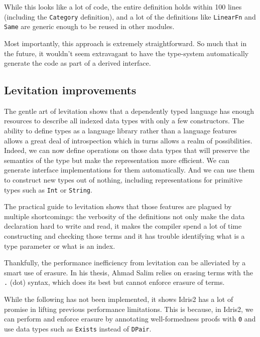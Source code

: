 \documentclass[
]{article}
\begin{document}
While this looks like a lot of code, the entire definition holds within
100 lines (including the \texttt{Category} definition), and a lot of the
definitions like \texttt{LinearFn} and \texttt{Same} are generic enough
to be reused in other modules.

Most importantly, this approach is extremely straightforward. So much
that in the future, it wouldn't seem extravagant to have the type-system
automatically generate the code as part of a derived interface.

\hypertarget{levitation-improvements}{%
\subsection{Levitation improvements}\label{levitation-improvements}}

The gentle art of levitation\cite{levitation} shows that a dependently
typed language has enough resources to describe all indexed data types
with only a few constructors. The ability to define types as a language
library rather than a language features allows a great deal of
introspection which in turns allows a realm of possibilities. Indeed, we
can now define operations on those data types that will preserve the
semantics of the type but make the representation more efficient. We can
generate interface implementations for them automatically. And we can
use them to construct new types out of nothing, including
representations for primitive types such as \texttt{Int} or
\texttt{String}.

The practical guide to levitation \cite{guide_to_levitation} shows that
those features are plagued by multiple shortcomings: the verbosity of
the definitions not only make the data declaration hard to write and
read, it makes the compiler spend a lot of time constructing and
checking those terms and it has trouble identifying what is a type
parameter or what is an index.

Thankfully, the performance inefficiency from levitation can be
alleviated by a smart use of erasure. In his thesis, Ahmad Salim relies
on erasing terms with the \texttt{.} (dot) syntax, which does its best
but cannot enforce erasure of terms.

While the following has not been implemented, it shows Idris2 has a lot
of promise in lifting previous performance limitations. This is because,
in Idris2, we can perform and enforce erasure by annotating
well-formedness proofs with \texttt{0} and use data types such as
\texttt{Exists} instead of \texttt{DPair}.
\end{document}
